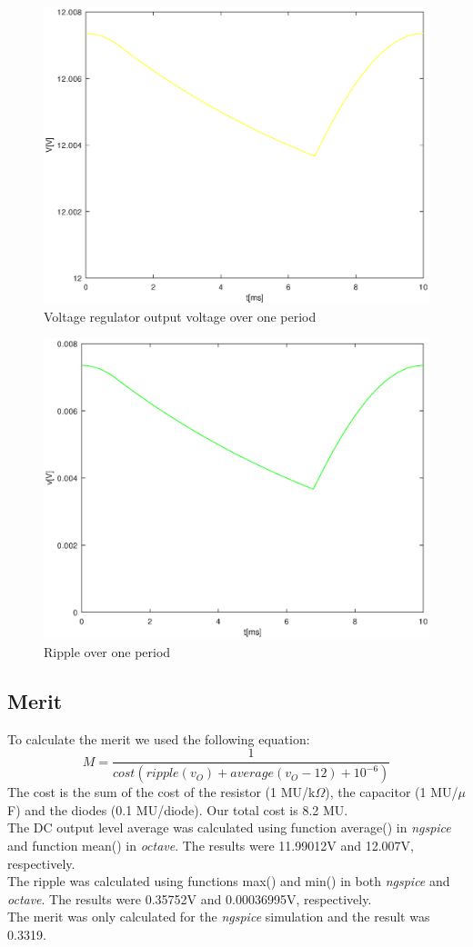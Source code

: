\begin{figure}[H] \centering
\includegraphics[width=0.4\linewidth]{vregulator.eps}
\caption{Voltage regulator output voltage over one period}
\label{fig:voreg}
\end{figure}

\begin{figure}[H] \centering
\includegraphics[width=0.4\linewidth]{vfinal.eps}
\caption{Ripple over one period}
\label{fig:vofinal}
\end{figure}

\subsection{Merit}
To calculate the merit we used the following equation:
\begin{equation}
M = \frac{1}{cost(ripple(v_O) + average(v_O - 12) + 10^{-6})}
\end{equation}
The cost is the sum of the cost of the resistor (1 MU/k$\Omega$), the capacitor (1 MU/$\mu$F) and the diodes (0.1 MU/diode). Our total cost is 8.2 MU.\\
The DC output level average was calculated using function average() in \textit{ngspice} and function mean() in \textit{octave}. The results were 11.99012V and 12.007V, respectively.\\
The ripple was calculated using functions max() and min() in both \textit{ngspice} and \textit{octave}. The results were 0.35752V and 0.00036995V, respectively.\\
The merit was only calculated for the \textit{ngspice} simulation and the result was 0.3319.